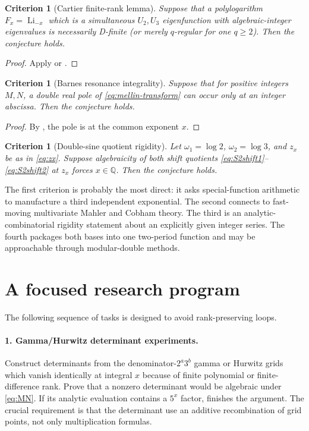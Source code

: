 \documentclass[11pt]{article}
\numberwithin{equation}{section}
\newtheorem{criterion}[theorem]{Criterion}
\theoremstyle{definition}
\theoremstyle{remark}
\newcommand{\Q}{\mathbb{Q}}
\newcommand{\Li}{\operatorname{Li}}
\begin{document}
\begin{criterion}[Cartier finite-rank lemma]
Suppose that a polylogarithm $F_x=\Li_{-x}$ which is a simultaneous $U_2,U_3$ eigenfunction with algebraic-integer eigenvalues is necessarily D-finite (or merely $q$-regular for one $q\ge2$).  Then the conjecture holds.
\end{criterion}

\begin{proof}
Apply  or .
\end{proof}

\begin{criterion}[Barnes resonance integrality]
Suppose that for positive integers $M,N$, a double real pole of \eqref{eq:mellin-transform} can occur only at an integer abscissa.  Then the conjecture holds.
\end{criterion}

\begin{proof}
By , the pole is at the common exponent $x$.
\end{proof}

\begin{criterion}[Double-sine quotient rigidity]
Let $\omega_1=\log2$, $\omega_2=\log3$, and $z_x$ be as in \eqref{eq:zx}.  Suppose algebraicity of both shift quotients \eqref{eq:S2shift1}--\eqref{eq:S2shift2} at $z_x$ forces $x\in\Q$.  Then the conjecture holds.
\end{criterion}

The first criterion is probably the most direct: it asks special-function arithmetic to manufacture a third independent exponential.  The second connects to fast-moving multivariate Mahler and Cobham theory.  The third is an analytic-combinatorial rigidity statement about an explicitly given integer series.  The fourth packages both bases into one two-period function and may be approachable through modular-double methods.

\section{A focused research program}
\label{sec:program}

The following sequence of tasks is designed to avoid rank-preserving loops.

\paragraph{1. Gamma/Hurwitz determinant experiments.}
Construct determinants from the denominator-$2^a3^b$ gamma or Hurwitz grids which vanish identically at integral $x$ because of finite polynomial or finite-difference rank.  Prove that a nonzero determinant would be algebraic under \eqref{eq:MN}.  If its analytic evaluation contains a $5^x$ factor,  finishes the argument.  The crucial requirement is that the determinant use an additive recombination of grid points, not only multiplication formulas.
\end{document}
